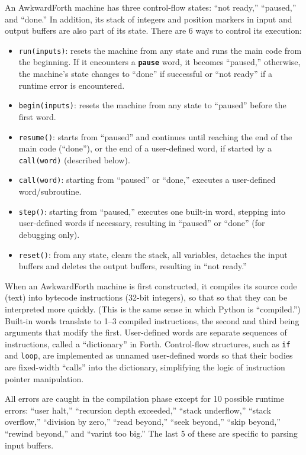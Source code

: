 \documentclass{webofc}
\begin{document}
An AwkwardForth machine has three control-flow states: ``not ready,'' ``paused,'' and ``done.'' In addition, its stack of integers and position markers in input and output buffers are also part of its state. There are 6 ways to control its execution:
\begin{itemize}
\item \texttt{run(inputs)}: resets the machine from any state and runs the main code from the beginning. If it encounters a \textcolor{OliveGreen}{\tt\textbf{pause}} word, it becomes ``paused,'' otherwise, the machine's state changes to ``done'' if successful or ``not ready'' if a runtime error is encountered.
\item \texttt{begin(inputs)}: resets the machine from any state to ``paused'' before the first word.
\item \texttt{resume()}: starts from ``paused'' and continues until reaching the end of the main code (``done''), or the end of a user-defined word, if started by a \texttt{call(word)} (described below).
\item \texttt{call(word)}: starting from ``paused'' or ``done,'' executes a user-defined word/subroutine.
\item \texttt{step()}: starting from ``paused,'' executes one built-in word, stepping into user-defined words if necessary, resulting in ``paused'' or ``done'' (for debugging only).
\item \texttt{reset()}: from any state, clears the stack, all variables, detaches the input buffers and deletes the output buffers, resulting in ``not ready.''
\end{itemize}

When an AwkwardForth machine is first constructed, it compiles its source code (text) into bytecode instructions (32-bit integers), so that so that they can be interpreted more quickly. (This is the same sense in which Python is ``compiled.'') Built-in words translate to 1--3 compiled instructions, the second and third being arguments that modify the first. User-defined words are separate sequences of instructions, called a ``dictionary'' in Forth. Control-flow structures, such as \texttt{if} and \texttt{loop}, are implemented as unnamed user-defined words so that their bodies are fixed-width ``calls'' into the dictionary, simplifying the logic of instruction pointer manipulation.

All errors are caught in the compilation phase except for 10 possible runtime errors: ``user halt,'' ``recursion depth exceeded,'' ``stack underflow,'' ``stack overflow,'' ``division by zero,'' ``read beyond,'' ``seek beyond,'' ``skip beyond,'' ``rewind beyond,'' and ``varint too big.'' The last 5 of these are specific to parsing input buffers.
\end{document}
